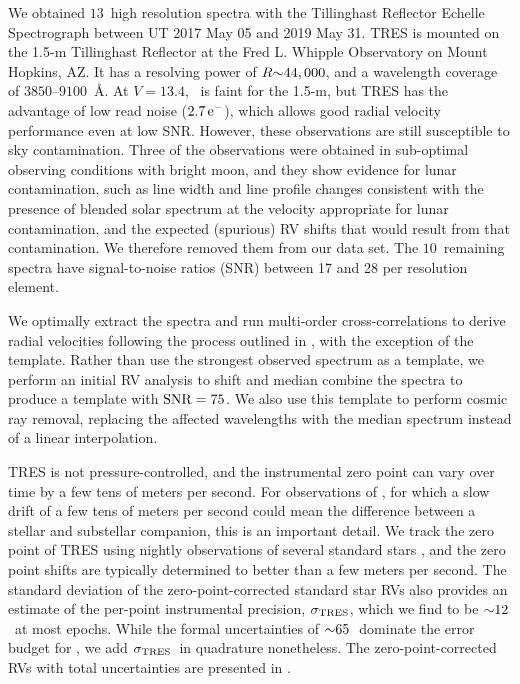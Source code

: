 \documentclass[twocolumn]{aastex63}
\begin{document}
We obtained $13$\ high resolution spectra with the Tillinghast Reflector Echelle Spectrograph \citep[TRES; ][]{furesz:2008} between UT 2017 May 05 and 2019 May 31. TRES is mounted on the 1.5-m Tillinghast Reflector at the Fred L. Whipple Observatory on Mount Hopkins, AZ. It has a resolving power of $R\mathord{\sim}44,000$, and a wavelength coverage of $3850$--$9100$\ {\AA}. At $V=13.4$, \thisstar\ is faint for the 1.5-m, but TRES has the advantage of low read noise ($2.7\,\mathrm{e^-}$), which allows good radial velocity performance even at low SNR. However, these observations are still susceptible to sky contamination. Three of the observations were obtained in sub-optimal observing conditions with bright moon, and they show evidence for lunar contamination, such as line width and line profile changes consistent with the presence of blended solar spectrum at the velocity appropriate for lunar contamination, and the expected (spurious) RV shifts that would result from that contamination. We therefore removed them from our data set. The $10$\ remaining spectra have signal-to-noise ratios (SNR) between 17 and 28 per resolution element.

We optimally extract the spectra and run multi-order cross-correlations to derive radial velocities following the process outlined in \citet{Buchhave:2010}, with the exception of the template. Rather than use the strongest observed spectrum as a template, we perform an initial RV analysis to shift and median combine the spectra to produce a template with ${\rm SNR}=75$. We also use this template to perform cosmic ray removal, replacing the affected wavelengths with the median spectrum instead of a linear interpolation. 

TRES is not pressure-controlled, and the instrumental zero point can vary over time by a few tens of meters per second. For observations of \thisstar, for which a slow drift of a few tens of meters per second could mean the difference between a stellar and substellar companion, this is an important detail. We track the zero point of TRES using nightly observations of several standard stars \citep[see, e.g.,][]{quinn:2012b}, and the zero point shifts are typically determined to better than a few meters per second. The standard deviation of the zero-point-corrected standard star RVs also provides an estimate of the per-point instrumental precision, $\sigma_{\rm TRES}$, which we find to be $\mathord{\sim}12$\,\ms\ at most epochs. While the formal uncertainties of $\mathord{\sim} 65$\,\ms\ dominate the error budget for \thisstar, we add $\sigma_{\rm TRES}$\ in quadrature nonetheless. The zero-point-corrected RVs with total uncertainties are presented in .
\end{document}
